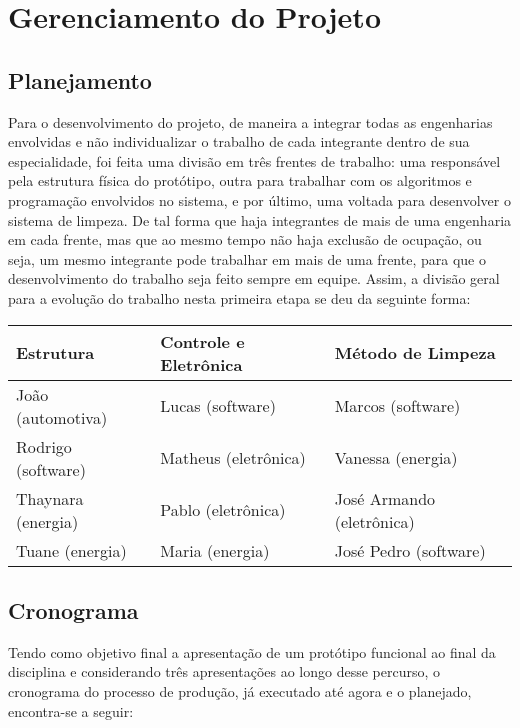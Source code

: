\section{Gerenciamento do Projeto}
\subsection{Planejamento}
Para o desenvolvimento do projeto, de maneira a integrar todas as engenharias envolvidas e não individualizar o trabalho de cada integrante dentro de sua especialidade, foi feita uma divisão em três frentes de trabalho: uma responsável pela estrutura física do protótipo, outra para trabalhar com os algoritmos e programação envolvidos no sistema, e por último, uma voltada para desenvolver o sistema de limpeza. De tal forma que haja integrantes de mais de uma engenharia em cada frente, mas que ao mesmo tempo não haja exclusão de ocupação, ou seja, um mesmo integrante pode trabalhar em mais de uma frente, para que o desenvolvimento do trabalho seja feito sempre em equipe.
Assim, a divisão geral para a evolução do trabalho nesta primeira etapa se deu da seguinte forma:

\begin{table}[h!]
  \begin{center}
    \begin{tabular}{|l|l|l|}
      \hline
      Estrutura & Controle e Eletrônica & Método de Limpeza \\
      \hline
      João (automotiva) & Lucas (software) & Marcos (software) \\
      Rodrigo (software) & Matheus (eletrônica) & Vanessa (energia) \\
      Thaynara (energia) & Pablo (eletrônica) & José Armando (eletrônica) \\
      Tuane (energia) & Maria (energia) & José Pedro (software) \\
      \hline
    \end{tabular}
  \end{center}
\end{table}


\subsection{Cronograma}
Tendo como objetivo final a apresentação de um protótipo funcional ao final da disciplina e considerando três apresentações ao longo desse percurso, o cronograma do processo de produção, já executado até agora e o planejado, encontra-se a seguir:

